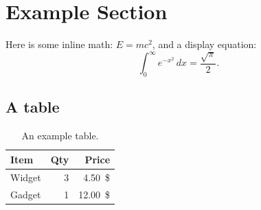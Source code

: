 \section{Example Section}

Here is some inline math: $E = mc^2$, and a display equation:
\[
  \int_0^\infty e^{-x^2}\,dx = \frac{\sqrt{\pi}}{2}.
\]

\subsection{A table}

\begin{table}[h]
  \centering
  \begin{tabular}{lrr}
    \toprule
    Item & Qty & Price \\
    \midrule
    Widget & 3 & \SI{4.50}{\$} \\
    Gadget & 1 & \SI{12.00}{\$} \\
    \bottomrule
  \end{tabular}
  \caption{An example table.}
\end{table}
